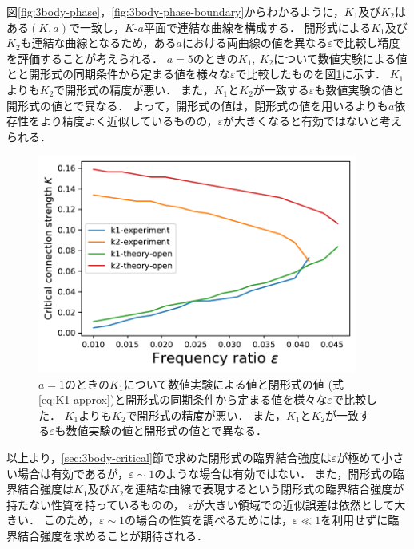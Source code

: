 \documentclass[../main]{subfiles}
\begin{document}
図\ref{fig:3body-phase}，\ref{fig:3body-phase-boundary}からわかるように，$K_1$及び$K_2$はある$(K,a)$で一致し，$K$-$a$平面で連結な曲線を構成する．
開形式による$K_1$及び$K_2$も連結な曲線となるため，ある$a$における両曲線の値を異なる$\varepsilon$で比較し精度を評価することが考えられる．
$a=5$のときの$K_1,\ K_2$について数値実験による値とと開形式の同期条件から定まる値を様々な$\varepsilon$で比較したものを図\ref{fig:k1k2-compare}に示す．
$K_1$よりも$K_2$で開形式の精度が悪い．
また，$K_1$と$K_2$が一致する$\varepsilon$も数値実験の値と開形式の値とで異なる．
よって，開形式の値は，閉形式の値を用いるよりも$a$依存性をより精度よく近似しているものの，$\varepsilon$が大きくなると有効ではないと考えられる．
\begin{figure}[tbp]
\centering
\includegraphics[width=105mm]{./images/k1k2-compare-open.pdf}
\centering
\caption{$a=1$のときの$K_1$について数値実験による値と閉形式の値 (式\eqref{eq:K1-approx})と開形式の同期条件から定まる値を様々な$\varepsilon$で比較した．
$K_1$よりも$K_2$で開形式の精度が悪い．
また，$K_1$と$K_2$が一致する$\varepsilon$も数値実験の値と開形式の値とで異なる．}
\label{fig:k1k2-compare}
\end{figure}

以上より，\ref{sec:3body-critical}節で求めた閉形式の臨界結合強度は$\varepsilon$が極めて小さい場合は有効であるが，$\varepsilon\sim 1$のような場合は有効ではない．
また，開形式の臨界結合強度は$K_1$及び$K_2$を連結な曲線で表現するという閉形式の臨界結合強度が持たない性質を持っているものの，
$\varepsilon$が大きい領域での近似誤差は依然として大きい．
このため，$\varepsilon\sim 1$の場合の性質を調べるためには，$\varepsilon\ll 1$を利用せずに臨界結合強度を求めることが期待される．
\end{document}
